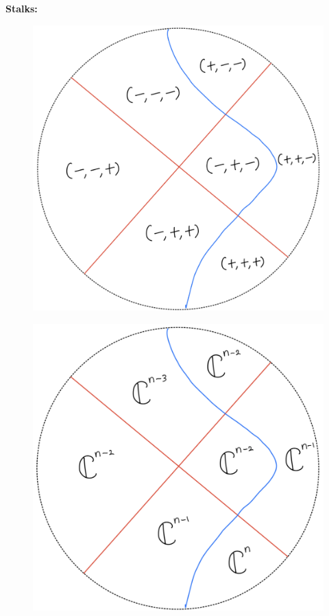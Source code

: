 \textbf{Stalks:}
\begin{figure}[H]
    \centering
    \includegraphics[scale = 0.95]{diagrams/lemma4/19.png}
    \caption{}
    \label{fig:your-label}
\end{figure}
\begin{figure}[H]
    \centering
    \includegraphics[scale = 0.95]{diagrams/cobord'4/20.png}
    \caption{}
    \label{fig:your-label}
\end{figure}
